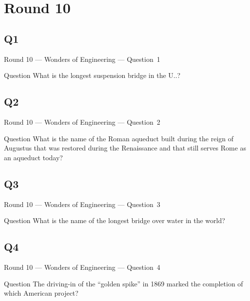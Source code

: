 \documentclass[11pt]{beamer}
\begin{document}
\section{Round 10}
\subsection*{Q1}
\begin{frame}[t]{Round 10 --- Wonders of Engineering --- \mbox{Question 1}}
    \vspace{-0.5em}
    \begin{block}{Question}
        What is the longest suspension bridge in the U.\@S.\@?
    \end{block}
\end{frame}
\subsection*{Q2}
\begin{frame}[t]{Round 10 --- Wonders of Engineering --- \mbox{Question 2}}
    \vspace{-0.5em}
    \begin{block}{Question}
        What is the name of the Roman aqueduct built during the reign of Augustus that was restored during the Renaissance and that still serves Rome as an aqueduct today?
    \end{block}
\end{frame}
\subsection*{Q3}
\begin{frame}[t]{Round 10 --- Wonders of Engineering --- \mbox{Question 3}}
    \vspace{-0.5em}
    \begin{block}{Question}
        What is the name of the longest bridge over water in the world?
    \end{block}
\end{frame}
\subsection*{Q4}
\begin{frame}[t]{Round 10 --- Wonders of Engineering --- \mbox{Question 4}}
    \vspace{-0.5em}
    \begin{block}{Question}
        The driving-in of the ``golden spike'' in 1869 marked the completion of which American project?
    \end{block}
\end{frame}
\end{document}
